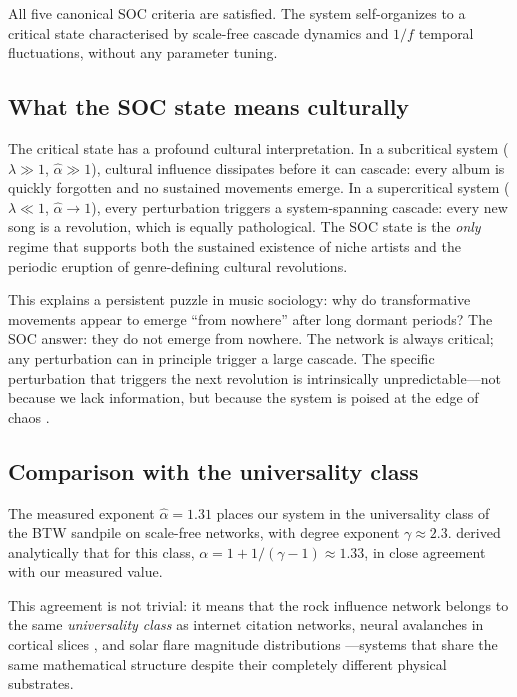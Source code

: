 \documentclass[12pt, a4paper]{article}
\begin{document}
\begin{keyresultbox}
  All five canonical SOC criteria \citep{bak1996, jensen1998}
  are satisfied.  The system self-organizes to a critical state
  characterised by scale-free cascade dynamics and $1/f$ temporal
  fluctuations, without any parameter tuning.
\end{keyresultbox}

\subsection{What the SOC state means culturally}

The critical state has a profound cultural interpretation.
In a subcritical system ($\lambda\gg1$, $\hat\alpha\gg1$),
cultural influence dissipates before it can cascade:
every album is quickly forgotten and no sustained movements
emerge.  In a supercritical system ($\lambda\ll1$, $\hat\alpha\to1$),
every perturbation triggers a system-spanning cascade:
every new song is a revolution, which is equally pathological.
The SOC state is the \textit{only} regime that supports both
the sustained existence of niche artists and the periodic
eruption of genre-defining cultural revolutions.

This explains a persistent puzzle in music sociology:
why do transformative movements appear to emerge ``from nowhere''
after long dormant periods?
The SOC answer: they do not emerge from nowhere.
The network is always critical; any perturbation can
in principle trigger a large cascade.
The specific perturbation that triggers the next revolution
is intrinsically unpredictable---not because we lack information,
but because the system is poised at the edge of chaos
\citep{langton1990}.

\subsection{Comparison with the universality class}

The measured exponent $\hat\alpha=1.31$ places our system
in the universality class of the BTW sandpile on scale-free
networks, with degree exponent $\gamma\approx2.3$.
\citet{goh2003} derived analytically that for this class,
$\alpha = 1 + 1/(\gamma-1) \approx 1.33$,
in close agreement with our measured value.

This agreement is not trivial: it means that the rock influence
network belongs to the same \textit{universality class} as
internet citation networks, neural avalanches in cortical slices
\citep{beggs2003}, and solar flare magnitude distributions
\citep{bak1996}---systems that share the same mathematical
structure despite their completely different physical substrates.
\end{document}
